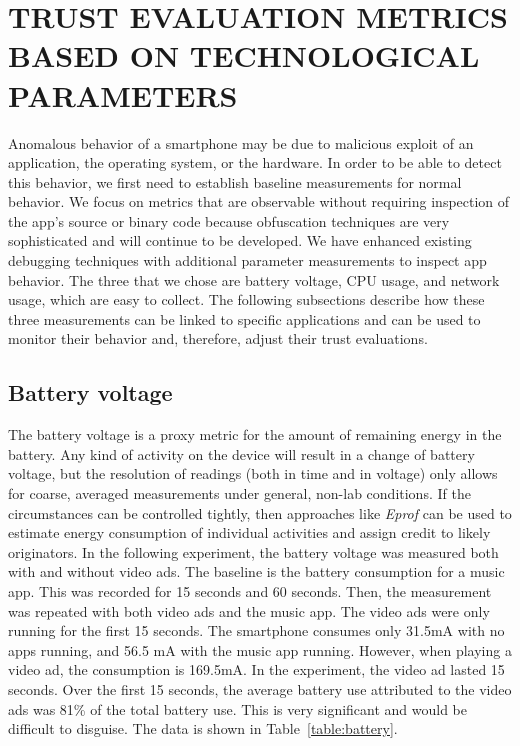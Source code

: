 \section{TRUST EVALUATION METRICS BASED ON TECHNOLOGICAL PARAMETERS}

Anomalous behavior of a smartphone may be due to malicious exploit of an application,
the operating system, or the hardware.
In order to be able to detect this
behavior, we first need to establish baseline measurements for 
normal behavior. We focus on metrics that are observable 
without requiring inspection of the app's source or binary code
because obfuscation techniques are very sophisticated and will continue to be developed.
We have enhanced existing debugging techniques with additional parameter measurements to inspect app behavior.
The three that we chose are battery voltage, CPU usage, and network usage, which are easy to collect.
The following subsections describe how these three measurements can be linked to specific applications
and can be used to monitor their behavior and, therefore, adjust their trust evaluations.


\subsection{Battery voltage}
The battery voltage is a proxy metric for the amount of remaining 
energy in the battery. Any kind of activity on the device will result 
in a change of battery voltage, but the resolution of readings (both 
in time and in voltage) only allows for coarse, averaged measurements 
under general, non-lab conditions.
If the circumstances can be controlled tightly, then approaches like 
\textit{Eprof} \cite{pathak2012fine} can be used to estimate energy consumption 
of individual activities and assign credit to likely originators.  In the following experiment,
the battery voltage was measured both with and without video ads.
The ​baseline is the battery consumption for a music app.
This was recorded for 15 seconds and 60 seconds.  Then, the measurement was repeated
with both video ads and the music app.  The video ads were only running for the first 15 seconds.
The smartphone consumes only 31.5mA with no apps running, and 56.5 mA with the music app
running.
However, when playing a video ad, the consumption is 169.5mA. 
In the experiment, the video ad lasted 15 seconds.
Over the first 15 seconds, the average battery use attributed to the video ads was 81\% of the total
battery use.  This is very significant and would be difficult to disguise.
The data is shown in Table~\ref{table:battery}.




